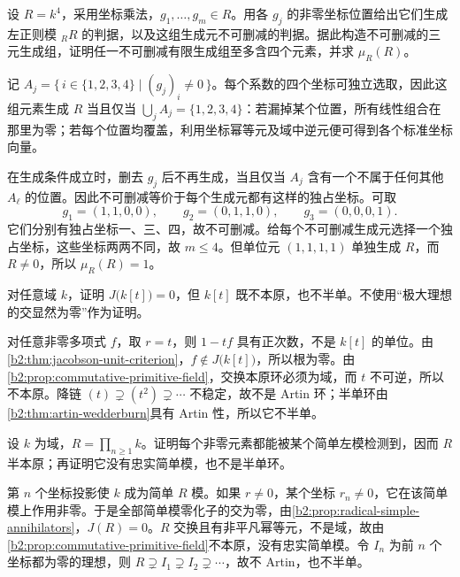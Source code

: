 \begin{exercise}\label{b2:ex:14-irredundant-not-minimum}
	设 \(R=k^4\)，采用坐标乘法，\(g_1,\ldots,g_m\in R\)。用各 \(g_j\) 的非零坐标位置给出它们生成左正则模 \({}_RR\) 的判据，以及这组生成元不可删减的判据。据此构造不可删减的三元生成组，证明任一不可删减有限生成组至多含四个元素，并求 \(\mu_R(R)\)。
\end{exercise}
\begin{solution}
	记 \(A_j=\{\,i\in\{1,2,3,4\}\mid(g_j)_i\ne0\,\}\)。每个系数的四个坐标可独立选取，因此这组元素生成 \(R\) 当且仅当 \(\bigcup_jA_j=\{1,2,3,4\}\)：若漏掉某个位置，所有线性组合在那里为零；若每个位置均覆盖，利用坐标幂等元及域中逆元便可得到各个标准坐标向量。

	在生成条件成立时，删去 \(g_j\) 后不再生成，当且仅当 \(A_j\) 含有一个不属于任何其他 \(A_\ell\) 的位置。因此不可删减等价于每个生成元都有这样的独占坐标。可取
	\[
		g_1=(1,1,0,0),\qquad g_2=(0,1,1,0),\qquad g_3=(0,0,0,1).
	\]
	它们分别有独占坐标一、三、四，故不可删减。给每个不可删减生成元选择一个独占坐标，这些坐标两两不同，故 \(m\le4\)。但单位元 \((1,1,1,1)\) 单独生成 \(R\)，而 \(R\ne0\)，所以 \(\mu_R(R)=1\)。
\end{solution}

\begin{exercise}\label{b2:ex:14-polynomial-semiprimitive}
	对任意域 \(k\)，证明 \(J\bigl(k[t]\bigr)=0\)，但 \(k[t]\) 既不本原，也不半单。不使用“极大理想的交显然为零”作为证明。
\end{exercise}
\begin{solution}
	对任意非零多项式 \(f\)，取 \(r=t\)，则 \(1-tf\) 具有正次数，不是 \(k[t]\) 的单位。由\cref{b2:thm:jacobson-unit-criterion}，\(f\notin J\bigl(k[t]\bigr)\)，所以根为零。由\cref{b2:prop:commutative-primitive-field}，交换本原环必须为域，而 \(t\) 不可逆，所以不本原。降链 \((t)\supsetneq(t^2)\supsetneq\cdots\) 不稳定，故不是 Artin 环；半单环由\cref{b2:thm:artin-wedderburn}具有 Artin 性，所以它不半单。
\end{solution}

\begin{exercise}\label{b2:ex:14-infinite-product}
	设 \(k\) 为域，\(R=\prod_{n\ge1}k\)。证明每个非零元素都能被某个简单左模检测到，因而 \(R\) 半本原；再证明它没有忠实简单模，也不是半单环。
\end{exercise}
\begin{solution}
	第 \(n\) 个坐标投影使 \(k\) 成为简单 \(R\) 模。如果 \(r\ne0\)，某个坐标 \(r_n\ne0\)，它在该简单模上作用非零。于是全部简单模零化子的交为零，由\cref{b2:prop:radical-simple-annihilators}，\(J(R)=0\)。\(R\) 交换且有非平凡幂等元，不是域，故由\cref{b2:prop:commutative-primitive-field}不本原，没有忠实简单模。令 \(I_n\) 为前 \(n\) 个坐标都为零的理想，则 \(R\supsetneq I_1\supsetneq I_2\supsetneq\cdots\)，故不 Artin，也不半单。
\end{solution}

